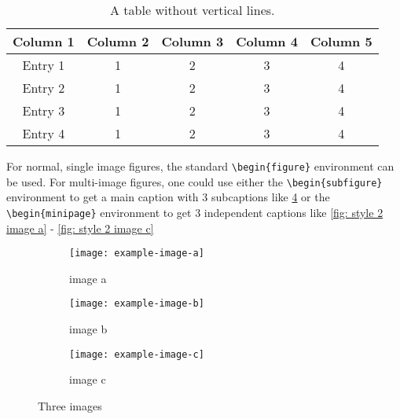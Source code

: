 \begin{table}[ht]
    \centering
    \caption{A table without vertical lines.}
    \begin{tabular}[t]{ccccc}
        \toprule
        \textbf{Column 1} & \textbf{Column 2} & \textbf{Column 3} & \textbf{Column 4} & \textbf{Column 5} \\
        \midrule
        Entry 1           & 1                 & 2                 & 3                 & 4                 \\
        Entry 2           & 1                 & 2                 & 3                 & 4                 \\
        Entry 3           & 1                 & 2                 & 3                 & 4                 \\
        Entry 4           & 1                 & 2                 & 3                 & 4                 \\
        \bottomrule
    \end{tabular}
    \label{table: style 2}
\end{table}

For normal, single image figures, the standard \texttt{\textbackslash begin\{figure\}} environment can be used. For multi-image figures, one could use either the \texttt{\textbackslash begin\{subfigure\}} environment to get a main caption with 3 subcaptions like \cref{fig: three images} or the \texttt{\textbackslash begin\{minipage\}} environment to get 3 independent captions like \cref{fig: style 2 image a} - \ref{fig: style 2 image c}

\begin{figure}[H]
    \centering
    \begin{subfigure}[b]{0.3\textwidth}
        \centering
        \texttt{[image: example-image-a]}
        \caption{image a}
        \label{fig: style 1 image a}
    \end{subfigure}
    \hfill
    \begin{subfigure}[b]{0.3\textwidth}
        \centering
        \texttt{[image: example-image-b]}
        \caption{image b}
        \label{fig: style 1 image b}
    \end{subfigure}
    \hfill
    \begin{subfigure}[b]{0.3\textwidth}
        \centering
        \texttt{[image: example-image-c]}
        \caption{image c}
        \label{fig: style 1 image c}
    \end{subfigure}
    \caption{Three images}
    \label{fig: three images}
\end{figure}

